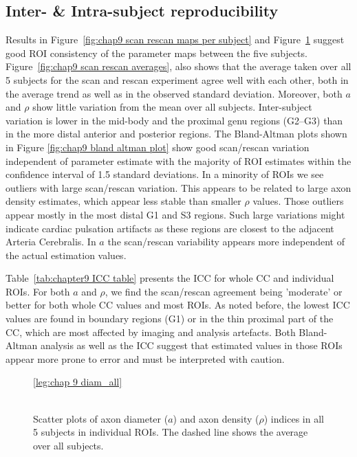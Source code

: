 \subsection*{Inter- \& Intra-subject reproducibility}
Results in Figure~\ref{fig:chap9 scan rescan maps per subject} and  Figure~\ref{fig:chap9 scan rescan scatterplots per subject} suggest good \gls{ROI} consistency of the parameter maps between the five subjects. Figure~\ref{fig:chap9 scan rescan averages}, also shows that the average taken over all 5 subjects for the scan and rescan experiment agree well with each other, both in the average trend as well as in the observed standard deviation. Moreover, both $a$ and $\rho$ show little variation from the mean over all subjects. Inter-subject variation is lower in the mid-body and the proximal genu regions (G2--G3) than in the more distal anterior and posterior regions. The Bland-Altman plots shown in Figure \ref{fig:chap9 bland altman plot} show good scan/rescan variation independent of parameter estimate with the majority of \gls{ROI} estimates within the confidence interval of 1.5 standard deviations. In a minority of \gls{ROI}s we see outliers with large scan/rescan variation. This appears to be related to large axon density estimates, which appear less stable than smaller $\rho$ values. Those outliers appear mostly in the most distal G1 and S3 regions. Such large variations might indicate cardiac pulsation artifacts as these regions are closest to the adjacent Arteria Cerebralis. In $a$ the scan/rescan variability appears more independent of the actual estimation values.


Table~\ref{tab:chapter9 ICC table} presents the \gls{ICC} for whole \gls{CC} and individual \gls{ROI}s. For both $a$ and $\rho$, we find the scan/rescan agreement being 'moderate' or better for both whole \gls{CC} values and most \gls{ROI}s. As noted before, the lowest ICC values are found in boundary regions (G1) or in the thin proximal part of the \gls{CC}, which are most affected by imaging and analysis artefacts. Both Bland-Altman analysis as well as the ICC suggest that estimated values in those \gls{ROI}s appear more prone to error and must be interpreted with caution.

\begin{figure}[ht]
	\centering
	\ref{leg:chap 9 diam_all}
	\\	
	\\
	\caption{Scatter plots of axon diameter ($a$) and axon density ($\rho$) indices in all 5 subjects in individual \gls{ROI}s. The dashed line shows the average over all subjects.}
	\label{fig:chap9 scan rescan scatterplots per subject}
\end{figure}

